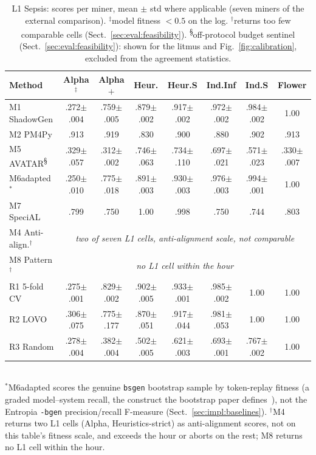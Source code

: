 \documentclass[runningheads]{llncs}
\newcommand{\chg}[1]{#1}
\begin{document}
\begin{table}[h]
\centering
\caption{L1 Sepsis: scores per miner, mean $\pm$ std where applicable (seven miners of the external comparison). $^{\ddagger}$model fitness $<0.5$ on the log. $^{\dagger}$returns too few comparable cells (Sect.~\ref{sec:eval:feasibility}). \chg{\textsuperscript{\S}off-protocol budget sentinel (Sect.~\ref{sec:eval:feasibility}): shown for the litmus and Fig.~\ref{fig:calibration}, excluded from the agreement statistics.}}
\label{tab:external}
\setlength{\tabcolsep}{1.6pt}
\scriptsize
\begin{tabular}{@{}lccccccc@{}}
\toprule
Method & Alpha$^{\ddagger}$ & Alpha$+$ & Heur. & Heur.S & Ind.Inf & Ind.S & Flower \\
\midrule
\chg{M1 ShadowGen} & .272$\pm$.004 & .759$\pm$.005 & .879$\pm$.002 & .917$\pm$.002 & .972$\pm$.002 & .984$\pm$.002 & 1.00 \\
M2 PM4Py & .913 & .919 & .830 & .900 & .880 & .902 & .913 \\
M5 AVATAR\chg{\textsuperscript{\S}} & .329$\pm$.057 & .312$\pm$.002 & .746$\pm$.063 & .734$\pm$.110 & .697$\pm$.021 & .571$\pm$.023 & .330$\pm$.007 \\
M6adapted$^{*}$ & .250$\pm$.010 & .775$\pm$.018 & .891$\pm$.003 & .930$\pm$.003 & .976$\pm$.003 & .994$\pm$.001 & 1.00 \\
M7 SpeciAL & .799 & .750 & 1.00 & .998 & .750 & .744 & .803 \\
M4 Anti-align.$^{\dagger}$ & \multicolumn{7}{c}{\emph{two of seven L1 cells, anti-alignment scale, not comparable}} \\
M8 Pattern$^{\dagger}$ & \multicolumn{7}{c}{\emph{no L1 cell within the hour}} \\
\midrule
R1 5-fold CV & .275$\pm$.001 & .829$\pm$.002 & .902$\pm$.005 & .933$\pm$.001 & .985$\pm$.002 & 1.00 & 1.00 \\
R2 LOVO & .306$\pm$.075 & .775$\pm$.177 & .870$\pm$.051 & .917$\pm$.044 & .981$\pm$.053 & 1.00 & 1.00 \\
R3 Random & .278$\pm$.004 & .382$\pm$.004 & .502$\pm$.005 & .621$\pm$.003 & .693$\pm$.001 & .767$\pm$.002 & 1.00 \\
\bottomrule
\end{tabular}\\[2pt]
{\scriptsize $^{*}$M6adapted scores the genuine \texttt{bsgen} bootstrap sample by token-replay fitness (a graded model--system recall, the construct the bootstrap paper defines~\cite{polyvyanyy2022bootstrap}), not the Entropia \texttt{-bgen} precision/recall F-measure (Sect.~\ref{sec:impl:baselines}). $^{\dagger}$M4 returns two L1 cells (Alpha, Heuristics-strict) as anti-alignment scores, not on this table's fitness scale, and exceeds the hour or aborts on the rest; M8 returns no L1 cell within the hour.}
\end{table}
\end{document}
